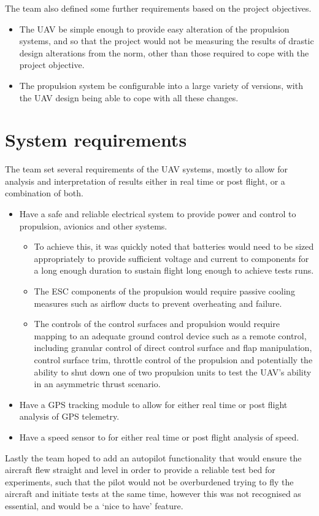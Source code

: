 \documentclass[../../main.tex]{subfiles}
\begin{document}
The team also defined some further requirements based on the project objectives.

\begin{itemize}
    \item The UAV be simple enough to provide easy alteration of the propulsion systems, and so that the project would not be measuring the results of drastic design alterations from the norm, other than those required to cope with the project objective. 
    \item The propulsion system be configurable into a large variety of versions, with the UAV design being able to cope with all these changes. 
\end{itemize}

\section{System requirements} \label{sec:design-specification:system-requirements}

The team set several requirements of the UAV systems, mostly to allow for analysis and interpretation of results either in real time or post flight, or a combination of both. 

\begin{itemize}
    \item Have a safe and reliable electrical system to provide power and control to propulsion, avionics and other systems.
        \begin{itemize}
            \item To achieve this, it was quickly noted that batteries would need to be sized appropriately to provide sufficient voltage and current to components for a long enough duration to sustain flight long enough to achieve tests runs. 
            \item The ESC components of the propulsion would require passive cooling measures such as airflow ducts to prevent overheating and failure. 
            \item The controls of the control surfaces and propulsion would require mapping to an adequate ground control device such as a remote control, including granular control of direct control surface and flap manipulation, control surface trim, throttle control of the propulsion and potentially the ability to shut down one of two propulsion units to test the UAV’s ability in an asymmetric thrust scenario. 
        \end{itemize}
    \item Have a GPS tracking module to allow for either real time or post flight analysis of GPS telemetry. 
    \item Have a speed sensor to for either real time or post flight analysis of speed. 
\end{itemize}

Lastly the team hoped to add an autopilot functionality that would ensure the aircraft flew straight and level in order to provide a reliable test bed for experiments, such that the pilot would not be overburdened trying to fly the aircraft and initiate tests at the same time, however this was not recognised as essential, and would be a ‘nice to have’ feature.
\end{document}
